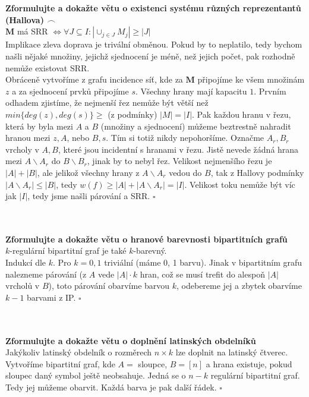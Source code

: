 \documentclass[a4paper]{article}
\newcommand{\fr}{$\frown$}
\newcommand{\led}{\hspace{0.2cm}$\square$}
\newcommand{\hlava}[1]{\text{} \\ \text{} \\ \text{} \hspace{-0.27cm} \textbf{#1} \\}
\begin{document}
\hlava{Zformulujte a dokažte větu o existenci systému různých reprezentantů (Hallova) \fr}
$\mathbf{M}$ má SRR $\Leftrightarrow \forall J \subseteq I: |\cup_{j \in J} M_j| \ge |J|$ \\
Implikace zleva doprava je trivální obměnou. Pokud by to neplatilo, tedy bychom našli nějaké množiny, jejichž sjednocení je méně, než jejich počet, pak rozhodně nemůže existovat SRR. \\
Obráceně vytvoříme z grafu incidence síť, kde za $\mathbf{M}$ připojíme ke všem množinám $z$ a za sjednocení prvků připojíme $s$. Všechny hrany mají kapacitu $1$. Prvním odhadem zjistíme, že nejmenší řez nemůže být větší než $min\{deg(z), deg(s)\} \ge $ (z podmínky) $|M|=|I|$. Pak každou hranu v řezu, která by byla mezi $A$ a $B$ (množiny a sjednocení) můžeme beztrestně nahradit hranou mezi $z,A$, nebo $B,s$. Tím si totiž nikdy nepohoršíme. Označme $A_r, B_r$ vrcholy v $A, B$, které jsou incidentní s hranami v řezu. Jistě nevede žádná hrana mezi $A \backslash A_r$ do $B \backslash B_r$, jinak by to nebyl řez. Velikost nejmenšího řezu je $|A| + |B|$, ale jelikož všechny hrany z $A\backslash A_r$ vedou do $B$, tak z Hallovy podmínky $|A\backslash A_r| \le |B|$, tedy $w(f) \ge |A| + |A\backslash A_r| = |I|$. Velikost toku nemůže být víc jak $|I|$, tedy jsme našli párování a SRR. \led

\hlava{Zformulujte a dokažte větu o hranové barevnosti bipartitních grafů}
$k$-regulární bipartitní graf je také $k$-barevný. \\
Indukcí dle $k$. Pro $k=0,1$ triviální (máme 0, 1 barvu). Jinak v bipartitním grafu nalezneme párování (z $A$ vede $|A|\cdot k$ hran, což se musí trefit do alespoň $|A|$ vrcholů v $B$), toto párování obarvíme barvou $k$, odebereme jej a zbytek obarvíme $k-1$ barvami z IP. \led

\hlava{Zformulujte a dokažte větu o doplnění latinských obdelníků}
Jakýkoliv latinský obdelník o rozměrech $n \times k$ lze doplnit na latinský čtverec. \\
Vytvoříme bipartitní graf, kde $A = $ sloupce, $B = [n]$ a hrana existuje, pokud sloupec daný symbol ještě neobsahuje. Jedná se o $n-k$ regulární bipartitní graf. Tedy jej můžeme obarvit. Každá barva je pak další řádek. \led
\end{document}
